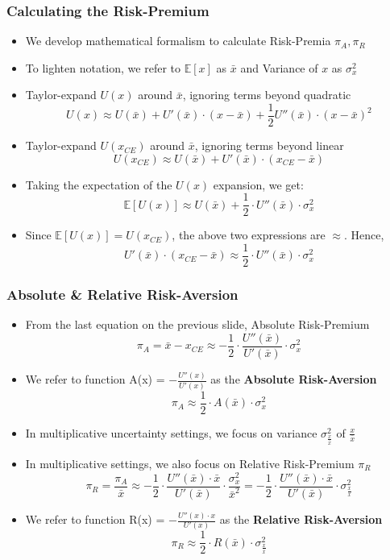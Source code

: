 \documentclass[handout]{beamer}
\begin{document}
\begin{frame}
\frametitle{Calculating the Risk-Premium}
\pause
\begin{itemize}[<+->]
\item We develop mathematical formalism to calculate Risk-Premia $\pi_A, \pi_R$
\item To lighten notation, we refer to $\mathbb{E}[x]$ as $\bar{x}$ and Variance of $x$ as $\sigma_x^2$
\item Taylor-expand $U(x)$ around $\bar{x}$, ignoring terms beyond quadratic
$$U(x) \approx U(\bar{x}) + U'(\bar{x}) \cdot (x - \bar{x}) + \frac 1 2 U''(\bar{x}) \cdot (x - \bar{x})^2$$
\item Taylor-expand $U(x_{CE})$ around $\bar{x}$, ignoring terms beyond linear
$$U(x_{CE}) \approx U(\bar{x}) + U'(\bar{x}) \cdot (x_{CE} - \bar{x})$$
\item Taking the expectation of the $U(x)$ expansion, we get:
$$\mathbb{E}[U(x)] \approx U(\bar{x}) + \frac 1 2 \cdot U''(\bar{x}) \cdot \sigma_x^2$$
\item Since $\mathbb{E}[U(x)] = U(x_{CE})$, the above two expressions are $\approx$. Hence,
$$U'(\bar{x}) \cdot (x_{CE} - \bar{x}) \approx \frac 1 2 \cdot U''(\bar{x}) \cdot \sigma_x^2$$
\end{itemize}
\end{frame}

\begin{frame}
\frametitle{Absolute \& Relative Risk-Aversion}
\pause
\begin{itemize}[<+->]
\item From the last equation on the previous slide, Absolute Risk-Premium
$$\pi_A = \bar{x} - x_{CE} \approx - \frac 1 2 \cdot \frac {U''(\bar{x})} {U'(\bar{x})} \cdot \sigma_x^2$$
\item We refer to function A(x) = $-\frac {U''(x)} {U'(x)}$ as the {\bf Absolute Risk-Aversion}
$$\pi_A \approx \frac 1 2 \cdot A(\bar{x}) \cdot \sigma_x^2$$
\item In multiplicative uncertainty settings, we focus on variance $\sigma_{\frac x {\bar{x}}}^2$ of $\frac x {\bar{x}}$ 
\item In multiplicative settings, we also focus on Relative Risk-Premium $\pi_R$
$$\pi_R = \frac {\pi_A} {\bar{x}} \approx - \frac 1 2 \cdot \frac {U''(\bar{x}) \cdot \bar{x}} {U'(\bar{x})} \cdot \frac {\sigma_x^2} {\bar{x}^2} = - \frac 1 2 \cdot \frac {U''(\bar{x}) \cdot \bar{x}} {U'(\bar{x})} \cdot \sigma_{\frac x {\bar{x}}}^2$$
\item We refer to function R(x) = $-\frac {U''(x) \cdot x} {U'(x)}$ as the {\bf Relative Risk-Aversion}
$$\pi_R \approx \frac 1 2 \cdot R(\bar{x}) \cdot \sigma_{\frac x {\bar{x}}}^2$$
\end{itemize}
\end{frame}
\end{document}
